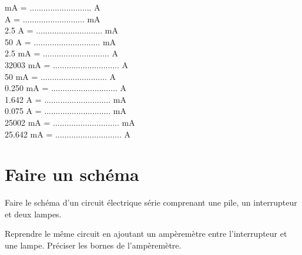 \documentclass[a4paper,11pt]{exam}
\begin{document}
\begin{multicols}{2}
	\begin{questions}
		 mA = ........................... A \\
		
		 A = ........................... mA \\
		
		\question \num{2.5} A = ............................. mA \\
		
		\question \num{50} A = ............................. mA \\
		
		\question \num{2.5} mA = ............................. A\\
		
		\question \num{32003} mA = ............................. A	\\
		
		\question \num{50} mA = ............................. A\\
				
		\question \num{0.250} mA = ............................. A\\
		
		
		\question \num{1.642} A = ............................. mA\\
		
		\question \num{0.075} A = ............................. mA	\\
		
		\question \num{25002} mA = ............................. mA	\\
		
		
		\question \num{25.642} mA = ............................. A\\
	\end{questions}
	
\end{multicols}

\newpage


\section{Faire un schéma}
 
 \begin{questions}
 	\question Faire le schéma d'un circuit électrique série comprenant une pile, un interrupteur et deux lampes.
 	
 	
 	\makeemptybox{7cm}
 	
 	
 	\question Reprendre le même circuit en ajoutant un ampèremètre entre l'interrupteur et une lampe. Préciser les bornes de l'ampèremètre.
 	
 	\makeemptybox{7cm}
 \end{questions}
 
%
\ \label{LastPage}
\end{document}
